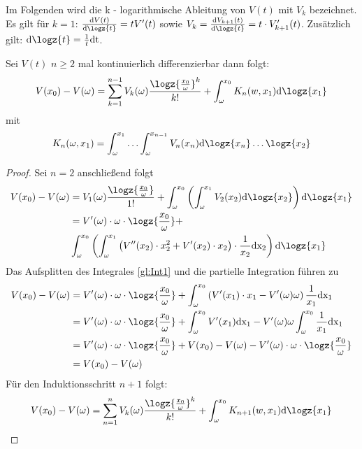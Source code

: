 Im Folgenden wird die k - logarithmische Ableitung von $V(t)$ mit $V_k$ bezeichnet. Es gilt für $k=1$: $\frac{\mathrm{d} V(t)}{\mathrm{d} \logz{t}} = t V'(t)$ sowie $V_k = \frac{\mathrm{d} V_{k+1}(t)}{\mathrm{d} \logz{t}} = t \cdot V'_{k+1}(t)$. Zusätzlich gilt: $\mathrm{d} \logz{t} = \frac{1}{t} \mathrm{dt}$.
\begin{lemma} \label{lem:z-hit1}
Sei $V(t)$ $n \geq 2$ mal kontinuierlich differenzierbar dann folgt:
\begin{align}
	V(x_0) - V(\omega) = \sum_{k=1}^{n-1} {V_k(\omega) \frac{\logz{\frac{x_0}{\omega}}^k}{k!}} + \int_\omega^{x_0} {K_n(w, x_1)} \mathrm{d} \logz{x_1}
\end{align}
mit 
\begin{align}
K_n(\omega, x_1) = \int_{\omega}^{x_1} \hdots \int_{\omega}^{x_{n-1}} V_n(x_n) \mathrm{d} \logz{x_n} \hdots \logz{x_2}
\end{align}
\begin{proof}
Sei $n = 2$ anschließend folgt
\begin{align}
	V(x_0) - V(\omega) &= V_1(\omega) \frac{\logz{\frac{x_0}{\omega}}}{1!} + \int_{\omega}^{x_0} \left( \int_{\omega}^{x_1} V_2(x_2) \mathrm{d} \logz{x_2} \right) \mathrm{d} \logz{x_1}\\
	&= V'(\omega) \cdot \omega \cdot \logz{\frac{x_0}{\omega}} + \\
	&\int_{\omega}^{x_0} \left( \int_{\omega}^{x_1} \left(V''(x_2) \cdot x_2^2 + V'(x_2) \cdot x_2 \right) \cdot \frac{1}{x_2} \mathrm{dx_2} \right) \mathrm{d} \logz{x_1}\label{gl:Int1}
\end{align}
Das Aufsplitten des Integrales \ref{gl:Int1} und die partielle Integration führen zu 
\begin{align}
   V(x_0) - V(\omega) &= V'(\omega) \cdot \omega \cdot \logz{\frac{x_0}{\omega}} + \int_{\omega}^{x_0} \left(V'(x_1) \cdot x_1 - V'(\omega) \omega \right) \frac{1}{x_1}  \mathrm{dx_1}\\
   &=  V'(\omega) \cdot \omega \cdot \logz{\frac{x_0}{\omega}} + \int_{\omega}^{x_0} V'(x_1) \mathrm{dx_1} - V'(\omega) \omega \int_{\omega}^{x_0} \frac{1}{x_1} \mathrm{dx_1}\\
   &= V'(\omega) \cdot \omega \cdot \logz{\frac{x_0}{\omega}} + V(x_0) - V(\omega) - V'(\omega) \cdot \omega \cdot \logz{\frac{x_0}{\omega}} \\
   &= V(x_0) - V(\omega)
\end{align}
Für den Induktionsschritt $n+1$ folgt:
\begin{align}
V(x_0) - V(\omega) &= \sum_{n=1}^{n} V_k(\omega) \frac{\logz{\frac{x_0}{\omega}}^k}{k!} + \int_\omega^{x_0} {K_{n+1}(w, x_1)} \mathrm{d} \logz{x_1}\\

\end{align}
\end{proof}
\end{lemma}
